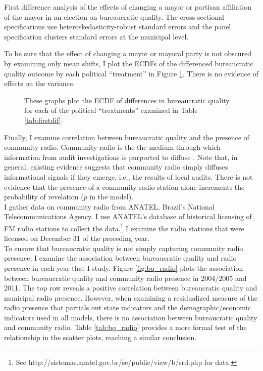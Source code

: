 \documentclass[11pt,english]{article}
\begin{document}
\begin{table}
\centering

\caption{First difference analysis of the effects of changing a mayor or partisan affiliation of the mayor in an election on bureaucratic quality. The cross-sectional specifications use heteroskedasticity-robust standard errors and the panel specification clusters standard errors at the municipal level.}\label{tab:firstdif}
\end{table}

To be sure that the effect of changing a mayor or mayoral party is not obscured by examining only mean shifts, I plot the ECDFs of the differenced bureaucratic quality outcome by each political ``treatment'' in Figure \ref{fig:ecdfs_first_dif}. There is no evidence of effects on the variance. 

\begin{figure}
\caption{These graphs plot the ECDF of differences in bureaucratic quality for each of the political ``treatments'' examined in Table \ref{tab:firstdif}.}\label{fig:ecdfs_first_dif}
\end{figure}
\clearpage


Finally, I examine correlation between bureaucratic quality and the presence of community radio. Community radio is the the medium through which information from audit investigations is purported to diffuse \citep{ferrazfinan2008}. Note that, in general, existing evidence suggests that community radio simply diffuses informational signals if they emerge, i.e., the results of local audits. There is not evidence that the presence of a community radio station alone increments the probability of revelation ($p$ in the model).\\

I gather data on community radio from ANATEL, Brazil's National Telecommunications Agency. I use ANATEL's database of historical licensing of FM radio stations to collect the data.\footnote{See http://sistemas.anatel.gov.br/se/public/view/b/srd.php for data.} I examine the radio stations that were licensed on December 31 of the preceding year.\\

To ensure that bureaucratic quality is not simply capturing community radio presence, I examine the association between bureaucratic quality and radio presence in each year that I study. Figure \ref{fig:bq_radio} plots the association between bureaucratic quality and community radio presence in 2004/2005 and 2011. The top row reveals a positive correlation between bureaucratic quality and municipal radio presence. However, when examining a residualized measure of the radio presence that partials out state indicators and the demographic/economic indicators used in all models, there is no association between bureaucratic quality and community radio. Table \ref{tab:bq_radio} provides a more formal test of the relationship in the scatter plots, reaching a similar conclusion. 
\end{document}
